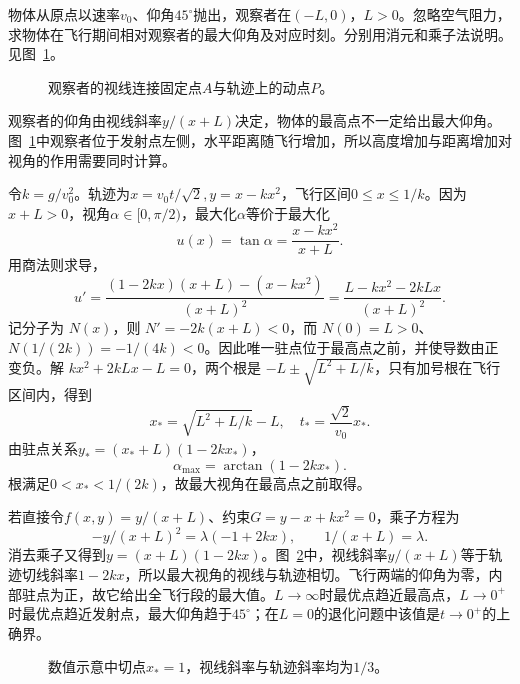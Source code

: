 \begin{example}[斜抛物体的最大视角]\label{ex:c3-e9}
物体从原点以速率$v_0$、仰角$45^\circ$抛出，观察者在$(-L,0)$，$L>0$。忽略空气阻力，求物体在飞行期间相对观察者的最大仰角及对应时刻。分别用消元和乘子法说明。 见图~\ref{fig:c3-e9-q}。
\end{example}

\begin{figure}[H]\centering
{}
\caption{观察者的视线连接固定点$A$与轨迹上的动点$P$。}\label{fig:c3-e9-q}
\end{figure}
\begin{solution}
观察者的仰角由视线斜率$y/(x+L)$决定，物体的最高点不一定给出最大仰角。图~\ref{fig:c3-e9-q}中观察者位于发射点左侧，水平距离随飞行增加，所以高度增加与距离增加对视角的作用需要同时计算。


令$k=g/v_0^2$。轨迹为$x=v_0t/\sqrt2,y=x-kx^2$，飞行区间$0\le x\le1/k$。因为$x+L>0$，视角$\alpha\in[0,\pi/2)$，最大化$\alpha$等价于最大化
\[u(x)=\tan\alpha=\frac{x-kx^2}{x+L}.\]
用商法则求导，
\[
u'=\frac{(1-2kx)(x+L)-(x-kx^2)}{(x+L)^2}
=\frac{L-kx^2-2kLx}{(x+L)^2}.
\]
记分子为 $N(x)$，则 $N'=-2k(x+L)<0$，而 $N(0)=L>0$、$N(1/(2k))=-1/(4k)<0$。因此唯一驻点位于最高点之前，并使导数由正变负。解 $kx^2+2kLx-L=0$，两个根是 $-L\pm\sqrt{L^2+L/k}$，只有加号根在飞行区间内，得到
\[\boxed{x_* =\sqrt{L^2+L/k}-L,\quad t_* =\frac{\sqrt2}{v_0}x_*}.\]
由驻点关系$y_*=(x_*+L)(1-2kx_*)$，
\[\boxed{\alpha_{\max}=\arctan(1-2kx_*)}.
\]
根满足$0<x_*<1/(2k)$，故最大视角在最高点之前取得。

若直接令$f(x,y)=y/(x+L)$、约束$G=y-x+kx^2=0$，乘子方程为
\[-y/(x+L)^2=\lambda(-1+2kx),\qquad 1/(x+L)=\lambda.
\]
消去乘子又得到$y=(x+L)(1-2kx)$。图~\ref{fig:c3-e9-s}中，视线斜率$y/(x+L)$等于轨迹切线斜率$1-2kx$，所以最大视角的视线与轨迹相切。飞行两端的仰角为零，内部驻点为正，故它给出全飞行段的最大值。$L\to\infty$时最优点趋近最高点，$L\to0^+$时最优点趋近发射点，最大仰角趋于$45^\circ$；在$L=0$的退化问题中该值是$t\to0^+$的上确界。



\begin{figure}[H]\centering
{}
\caption{数值示意中切点$x_*=1$，视线斜率与轨迹斜率均为$1/3$。}\label{fig:c3-e9-s}
\end{figure}
\end{solution}


